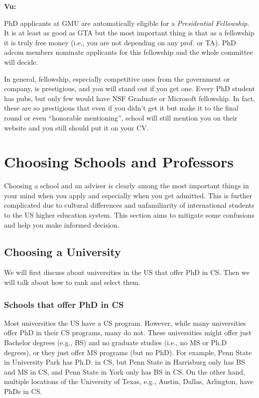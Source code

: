 \documentclass[oneside,11pt]{book}
\newenvironment{commentbox}[1][]{
  \small
  \begin{mybox}
    {\small \textbf{#1}}
  }{
  \end{mybox}
}
\begin{document}
\begin{commentbox}[Vu:]
  PhD applicants at GMU are automatically eligible for a \emph{Presidential Fellowship}.  It is at least as good as GTA but the most important thing is that as a fellowship it is truly free money (i.e., you are not depending on any prof. or TA).  PhD adcom members nominate applicants for this fellowship and the whole committee will decide.
\end{commentbox}

In general, fellowship, especially competitive ones from the government or company, is prestigious, and you will stand out if you get one.  Every PhD student has pubs, but only few  would have NSF Graduate or Microsoft fellowship. In fact, these are so prestigious that even if you didn't get it but make it to the final round or even ``honorable mentioning'', school will still mention you on their website and you still should put it on your CV.


\chapter{Choosing Schools and Professors}\label{sec:schoolsandprofs}

Choosing a school and an adviser is clearly among the most important things in your mind when you apply and especially when you get admitted.  This is further complicated due to cultural differences and unfamiliarity of  international students to the US higher education system.  This section aims to mitigate some confusions and help you make informed decision.

\section{Choosing a University}

We will first discuss about universities in the US that offer PhD in CS. Then we will talk about how to rank and select them.

\subsection{Schools that offer PhD in CS}  

Most universities the US have a CS program.
However, while many universities offer PhD in their CS programs, many do not.  These universities might offer just Bachelor degrees (e.g., BS) and no graduate studies (i.e., no MS or Ph.D degrees), or they just offer MS programs (but no PhD). For example, Penn State in University Park has Ph.D. in CS,  but Penn State in Harrisburg only has BS and MS in CS, and Penn State in York only has BS in CS.  On the other hand, multiple locations of the University of Texas, e.g., Austin, Dallas, Arlington, have PhDs in CS. 
\end{document}
